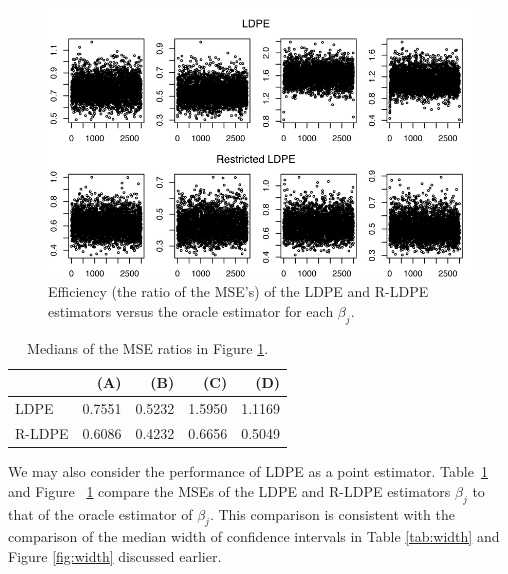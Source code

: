 \documentclass[11pt]{amsart}
\begin{document}
\begin{centering}
\begin{figure}[ht]
\includegraphics{efficiency.pdf}
\caption{Efficiency (the ratio of the MSE's) of the LDPE and R-LDPE estimators versus the oracle estimator for each $\beta_j$.} 
\label{fig:eff}
\end{figure}
\end{centering}
\begin{table}[ht]
\begin{tabular}{lrrrr}
\toprule
& (A) & (B) & (C) & (D) \\
\midrule
LDPE & 0.7551 & 0.5232 & 1.5950 & 1.1169 \\
R-LDPE & 0.6086 & 0.4232 & 0.6656 & 0.5049 \\
\bottomrule
\end{tabular}
\caption{Medians of the MSE ratios in Figure \ref{fig:eff}.}
\label{tab:eff}
\end{table}

We may also consider the performance of LDPE as a point estimator. 
Table~\ref{tab:eff} and Figure ~\ref{fig:eff} compare the MSEs of the LDPE and R-LDPE 
estimators $\beta_j$ to that of the oracle estimator of $\beta_j$. 
This comparison is consistent with the comparison of the median width of confidence intervals 
in Table \ref{tab:width} and Figure \ref{fig:width} discussed earlier.
\end{document}
